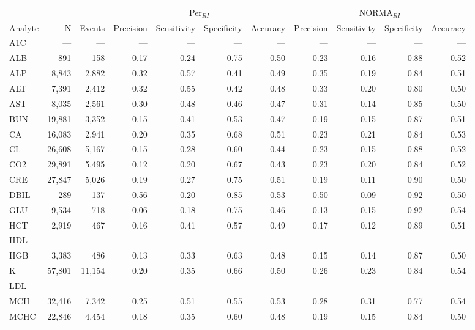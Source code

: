 \begin{table}[ht]
\centering
\footnotesize
\begin{tabular}{lrrrrrrrrrr}
\toprule
 & &  & \multicolumn{4}{c}{Per$_{RI}$} & \multicolumn{4}{c}{NORMA$_{RI}$} \\
\cmidrule(lr){4-7} \cmidrule(lr){8-11}
Analyte & N & Events & Precision & Sensitivity & Specificity & Accuracy & Precision & Sensitivity & Specificity & Accuracy \\
\midrule
A1C & --- & --- & --- & --- & --- & --- & --- & --- & --- & --- \\
ALB & 891 & 158 & 0.17 & 0.24 & 0.75 & 0.50 & 0.23 & 0.16 & 0.88 & 0.52 \\
ALP & 8,843 & 2,882 & 0.32 & 0.57 & 0.41 & 0.49 & 0.35 & 0.19 & 0.84 & 0.51 \\
ALT & 7,391 & 2,412 & 0.32 & 0.55 & 0.42 & 0.48 & 0.33 & 0.20 & 0.80 & 0.50 \\
AST & 8,035 & 2,561 & 0.30 & 0.48 & 0.46 & 0.47 & 0.31 & 0.14 & 0.85 & 0.50 \\
BUN & 19,881 & 3,352 & 0.15 & 0.41 & 0.53 & 0.47 & 0.19 & 0.15 & 0.87 & 0.51 \\
CA & 16,083 & 2,941 & 0.20 & 0.35 & 0.68 & 0.51 & 0.23 & 0.21 & 0.84 & 0.53 \\
CL & 26,608 & 5,167 & 0.15 & 0.28 & 0.60 & 0.44 & 0.23 & 0.15 & 0.88 & 0.52 \\
CO2 & 29,891 & 5,495 & 0.12 & 0.20 & 0.67 & 0.43 & 0.23 & 0.20 & 0.84 & 0.52 \\
CRE & 27,847 & 5,026 & 0.19 & 0.27 & 0.75 & 0.51 & 0.19 & 0.11 & 0.90 & 0.50 \\
DBIL & 289 & 137 & 0.56 & 0.20 & 0.85 & 0.53 & 0.50 & 0.09 & 0.92 & 0.50 \\
GLU & 9,534 & 718 & 0.06 & 0.18 & 0.75 & 0.46 & 0.13 & 0.15 & 0.92 & 0.54 \\
HCT & 2,919 & 467 & 0.16 & 0.41 & 0.57 & 0.49 & 0.17 & 0.12 & 0.89 & 0.51 \\
HDL & --- & --- & --- & --- & --- & --- & --- & --- & --- & --- \\
HGB & 3,383 & 486 & 0.13 & 0.33 & 0.63 & 0.48 & 0.15 & 0.14 & 0.87 & 0.50 \\
K & 57,801 & 11,154 & 0.20 & 0.35 & 0.66 & 0.50 & 0.26 & 0.23 & 0.84 & 0.54 \\
LDL & --- & --- & --- & --- & --- & --- & --- & --- & --- & --- \\
MCH & 32,416 & 7,342 & 0.25 & 0.51 & 0.55 & 0.53 & 0.28 & 0.31 & 0.77 & 0.54 \\
MCHC & 22,846 & 4,454 & 0.18 & 0.35 & 0.60 & 0.48 & 0.19 & 0.15 & 0.84 & 0.50 \\

\end{tabular}
\end{table}
